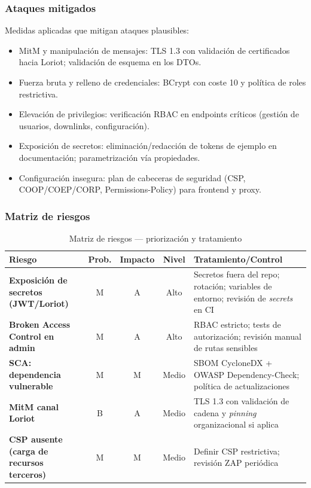 \documentclass[12pt,a4paper,oneside]{report}
\begin{document}
\subsubsection{Ataques mitigados}

Medidas aplicadas que mitigan ataques plausibles:
\begin{itemize}
  \item MitM y manipulación de mensajes: TLS 1.3 con validación de certificados hacia Loriot; validación de esquema en los DTOs.
  \item Fuerza bruta y relleno de credenciales: BCrypt con coste 10 y política de roles restrictiva.
  \item Elevación de privilegios: verificación RBAC en endpoints críticos (gestión de usuarios, downlinks, configuración).
  \item Exposición de secretos: eliminación/redacción de tokens de ejemplo en documentación; parametrización vía propiedades.
  \item Configuración insegura: plan de cabeceras de seguridad (CSP, COOP/COEP/CORP, Permissions-Policy) para frontend y proxy.
\end{itemize}

\subsubsection{Matriz de riesgos}

\begin{table}[H]
\caption{Matriz de riesgos — priorización y tratamiento}
\label{tab:matriz-riesgos}
\centering
\begin{tabularx}{\textwidth}{>{\bfseries}l c c c X}
\toprule
Riesgo & Prob. & Impacto & Nivel & Tratamiento/Control \\
\midrule
Exposición de secretos (JWT/Loriot) & M & A & Alto & Secretos fuera del repo; rotación; variables de entorno; revisión de \textit{secrets} en CI \\
Broken Access Control en admin & M & A & Alto & RBAC estricto; tests de autorización; revisión manual de rutas sensibles \\
SCA: dependencia vulnerable & M & M & Medio & SBOM CycloneDX + OWASP Dependency-Check; política de actualizaciones \\
MitM canal Loriot & B & A & Medio & TLS 1.3 con validación de cadena y \textit{pinning} organizacional si aplica \\
CSP ausente (carga de recursos terceros) & M & M & Medio & Definir CSP restrictiva; revisión ZAP periódica \\
\bottomrule
\end{tabularx}
\end{table}
\end{document}
